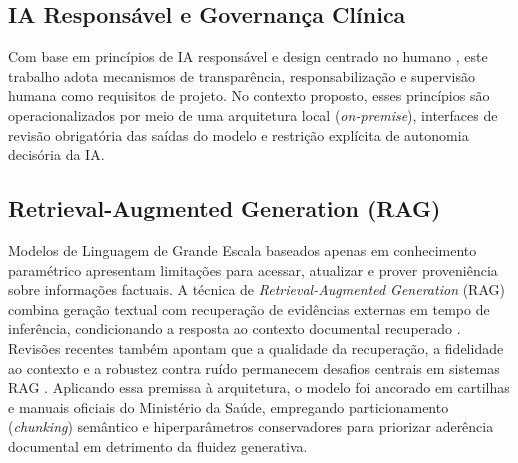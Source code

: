 \documentclass[12pt]{article}
\begin{document}
\subsection{IA Responsável e Governança Clínica}
Com base em princípios de IA responsável e design centrado no humano \cite{Shneiderman2021, Cabitza2022}, este trabalho adota mecanismos de transparência, responsabilização e supervisão humana como requisitos de projeto.
No contexto proposto, esses princípios são operacionalizados por meio de uma arquitetura local (\textit{on-premise}), interfaces de revisão obrigatória das saídas do modelo e restrição explícita de autonomia decisória da IA.

\subsection{Retrieval-Augmented Generation (RAG)}
Modelos de Linguagem de Grande Escala baseados apenas em conhecimento paramétrico apresentam limitações para acessar, atualizar e prover proveniência sobre informações factuais.
A técnica de \textit{Retrieval-Augmented Generation} (RAG) combina geração textual com recuperação de evidências externas em tempo de inferência, condicionando a resposta ao contexto documental recuperado \cite{Lewis2020RAG}.
Revisões recentes também apontam que a qualidade da recuperação, a fidelidade ao contexto e a robustez contra ruído permanecem desafios centrais em sistemas RAG \cite{Sharma2025RAGSurvey}.
Aplicando essa premissa à arquitetura, o modelo foi ancorado em cartilhas e manuais oficiais do Ministério da Saúde, empregando particionamento (\textit{chunking}) semântico e hiperparâmetros conservadores para priorizar aderência documental em detrimento da fluidez generativa.

\end{document}
